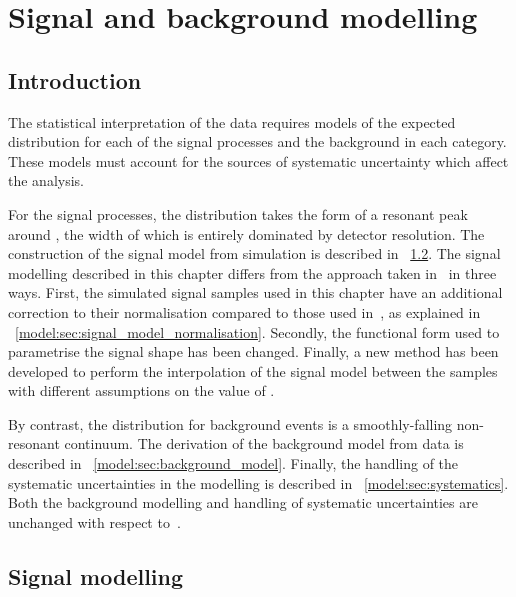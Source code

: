 \chapter{Signal and background modelling}
\label{chap:model}

\section{Introduction}
\label{model:sec:intro}

The statistical interpretation of the data requires models of the expected \mgg distribution for each of the signal processes and the background in each category. These models must account for the sources of systematic uncertainty which affect the analysis. %

For the signal processes, the \mgg distribution takes the form of a resonant peak around \mH, the width of which is entirely dominated by detector resolution. The construction of the signal model from simulation is described in \Sec~\ref{model:sec:signal_model}. 
The signal modelling described in this chapter differs from the approach taken in~\cite{CMS-PAS-HIG-16-020} in three ways. First, the simulated signal samples used in this chapter have an additional correction to their normalisation compared to those used in~\cite{CMS-PAS-HIG-16-020}, as explained in \Sec~\ref{model:sec:signal_model_normalisation}. Secondly, the functional form used to parametrise the signal shape has been changed. Finally, a new method has been developed to perform the interpolation of the signal model between the samples with different assumptions on the value of \mH.

By contrast, the \mgg distribution for background events is a smoothly-falling non-resonant continuum. The derivation of the background model from data is described in \Sec~\ref{model:sec:background_model}. Finally, the handling of the systematic uncertainties in the modelling is described in \Sec~\ref{model:sec:systematics}. Both the background modelling and handling of systematic uncertainties are unchanged with respect to~\cite{CMS-PAS-HIG-16-020}.



\section{Signal modelling}
\label{model:sec:signal_model}

